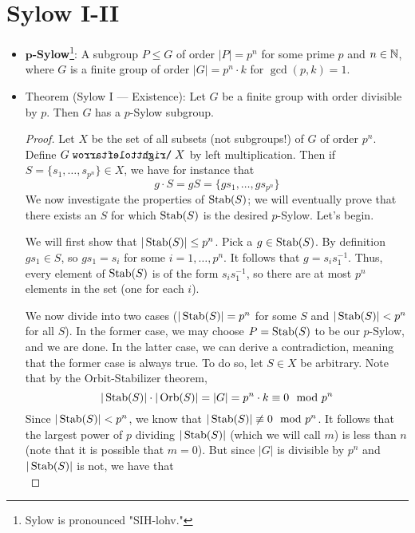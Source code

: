 \documentclass[../notes.tex]{subfiles}
\begin{document}
\section{Sylow I-II}
\begin{itemize}
    \item {}\textbf{$\bm{p}$-Sylow}\footnote{Sylow is pronounced "SIH-lohv."}: A subgroup $P\leq G$ of order $|P|=p^n$ for some prime $p$ and $n\in\mathbb{N}$, where $G$ is a finite group of order $|G|=p^n\cdot k$ for $\gcd(p,k)=1$.
    \item Theorem (Sylow I --- Existence): Let $G$ be a finite group with order divisible by $p$. Then $G$ has a $p$-Sylow subgroup.
    \begin{proof}
        Let $X$ be the set of all subsets (not subgroups!) of $G$ of order $p^n$. Define $G\acts X$ by left multiplication. Then if $S=\{s_1,\dots,s_{p^n}\}\in X$, we have for instance that
        \begin{equation*}
            g\cdot S = gS = \{gs_1,\dots,gs_{p^n}\}
        \end{equation*}
        We now investigate the properties of $\operatorname{Stab}(S)$; we will eventually prove that there exists an $S$ for which $\operatorname{Stab}(S)$ is the desired $p$-Sylow. Let's begin.\par
        We will first show that $|\operatorname{Stab}(S)|\leq p^n$. Pick a $g\in\operatorname{Stab}(S)$. By definition $gs_1\in S$, so $gs_1=s_i$ for some $i=1,\dots,p^n$. It follows that $g=s_is_1^{-1}$. Thus, every element of $\operatorname{Stab}(S)$ is of the form $s_is_1^{-1}$, so there are at most $p^n$ elements in the set (one for each $i$).\par
        We now divide into two cases ($|\operatorname{Stab}(S)|=p^n$ for some $S$ and $|\operatorname{Stab}(S)|<p^n$ for all $S$). In the former case, we may choose $P=\operatorname{Stab}(S)$ to be our $p$-Sylow, and we are done. In the latter case, we can derive a contradiction, meaning that the former case is always true. To do so, let $S\in X$ be arbitrary. Note that by the Orbit-Stabilizer theorem,
        \begin{equation*}
            |\operatorname{Stab}(S)|\cdot|\operatorname{Orb}(S)| = |G| = p^n\cdot k \equiv 0\mod p^n
        \end{equation*}
        Since $|\operatorname{Stab}(S)|<p^n$, we know that $|\operatorname{Stab}(S)|\not\equiv 0\mod p^n$. It follows that the largest power of $p$ dividing $|\operatorname{Stab}(S)|$ (which we will call $m$) is less than $n$ (note that it is possible that $m=0$). But since $|G|$ is divisible by $p^n$ and $|\operatorname{Stab}(S)|$ is not, we have that
        \begin{equation*}

\end{equation*}
\end{proof}
\end{itemize}
\end{document}
